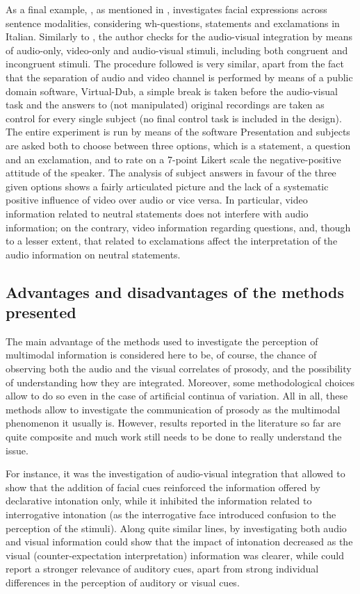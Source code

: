 \documentclass[output=paper]{langsci/langscibook}
\begin{document}
As a final example, \citet{GiliFivela2015informazionimultimodali}, as mentioned in , investigates facial expressions across sentence modalities, considering wh-questions, statements and exclamations in Italian. Similarly to  \citet{CrespoSendra2013}, the author checks for the audio-visual integration by means of audio-only, video-only and audio-visual stimuli, including both congruent and incongruent stimuli. The procedure followed is very similar, apart from the fact that the separation of audio and video channel is performed by means of a public domain software, Virtual-Dub, a simple break is taken before the audio-visual task and the answers to (not manipulated) original recordings are taken as control for every single subject (no final control task is included in the design). The entire experiment is run by means of the software Presentation and subjects are asked both to choose between three options, which is a statement, a question and an exclamation, and to rate on a 7-point Likert scale the negative-positive attitude of the speaker. The analysis of subject answers in favour of the three given options shows a fairly articulated picture and the lack of a systematic positive influence of video over audio or vice versa. In particular, video information related to neutral statements does not interfere with audio information; on the contrary, video information regarding questions, and, though to a lesser extent, that related to exclamations affect the interpretation of the audio information on neutral statements. 
 
\subsection{Advantages and disadvantages of the methods presented} \label{sec:gil:3:3}
The main advantage of the methods used to investigate the perception of multimodal information is considered here to be, of course, the chance of observing both the audio and the visual correlates of prosody, and the possibility of understanding how they are integrated. Moreover, some methodological choices allow to do so even in the case of artificial continua of variation. All in all, these methods allow to investigate the communication of prosody as the multimodal phenomenon it usually is. However, results reported in the literature so far are quite composite and much work still needs to be done to really understand the issue. 

For instance, it was the investigation of audio-visual integration that allowed \citet{House2002} to show that the addition of facial cues reinforced the information offered by declarative intonation only, while it inhibited the information related to interrogative intonation (as the interrogative face introduced confusion to the perception of the stimuli). Along quite similar lines, by investigating both audio and visual information \citet{BorrasComes2011} could show that the impact of intonation decreased as the visual (counter-expectation interpretation) information was clearer, while \citet{Srinivasan2003} could report a stronger relevance of auditory cues, apart from strong individual differences in the perception of auditory or visual cues.
\end{document}
